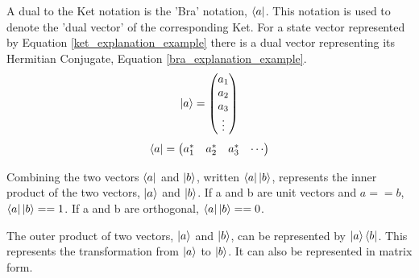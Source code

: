 A dual to the Ket notation is the 'Bra' notation, $\left\langle{a}\right\vert$.
This notation is used to denote the 'dual vector' of the corresponding Ket.
For a state vector represented by Equation \ref{ket_explanation_example} there is a dual vector representing its Hermitian Conjugate, Equation \ref{bra_explanation_example}.
\begin{equation}
\label{ket_explanation_example}
\left\vert{a}\right\rangle = 
\begin{pmatrix}
a_1\\
a_2\\
a_3\\
\vdots
\end{pmatrix}
\end{equation}
\begin{equation}
\label{bra_explanation_example}
\left\langle{a}\right\vert = 
\begin{pmatrix}
a_1^{*}&
a_2^{*}&
a_3^{*}&
\cdots
\end{pmatrix}
\end{equation}

Combining the two vectors $\left\langle{a}\right\vert$ and $\left\vert{b}\right\rangle$, written $\left\langle{a}\right\vert\left\vert{b}\right\rangle$, represents the inner product of the two vectors, $\left\vert{a}\right\rangle$ and $\left\vert{b}\right\rangle$.
If a and b are unit vectors and $a == b$, $\left\langle{a}\right\vert\left\vert{b}\right\rangle == 1$.
If a and b are orthogonal, $\left\langle{a}\right\vert\left\vert{b}\right\rangle == 0$.

The outer product of two vectors, $\left\vert{a}\right\rangle$ and $\left\vert{b}\right\rangle$, can be represented by $\left\vert{a}\right\rangle\left\langle{b}\right\vert$.
This represents the transformation from $\left\vert{a}\right\rangle$ to $\left\vert{b}\right\rangle$.
It can also be represented in matrix form.

